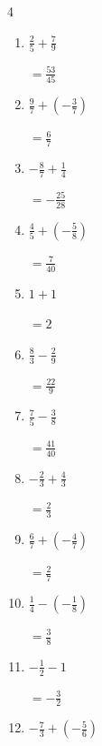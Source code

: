 \begin{multicols}{4}
\begin{enumerate}
        $\displaystyle =\frac{41}{18}$

  \item $\displaystyle \frac{2}{5} + \frac{7}{9}$

        $\displaystyle =\frac{53}{45}$

  \item $\displaystyle \frac{9}{7} + \left(-\frac{3}{7}\right)$

        $\displaystyle =\frac{6}{7}$

  \item $\displaystyle -\frac{8}{7} + \frac{1}{4}$

        $\displaystyle =-\frac{25}{28}$

  \item $\displaystyle \frac{4}{5} + \left(-\frac{5}{8}\right)$

        $\displaystyle =\frac{7}{40}$

  \item $\displaystyle 1 + 1$

        $\displaystyle =2$

  \item $\displaystyle \frac{8}{3} - \frac{2}{9}$

        $\displaystyle =\frac{22}{9}$

  \item $\displaystyle \frac{7}{5} - \frac{3}{8}$

        $\displaystyle =\frac{41}{40}$

  \item $\displaystyle -\frac{2}{3} + \frac{4}{3}$

        $\displaystyle =\frac{2}{3}$

  \item $\displaystyle \frac{6}{7} + \left(-\frac{4}{7}\right)$

        $\displaystyle =\frac{2}{7}$

\columnbreak %

  \item $\displaystyle \frac{1}{4} - \left(-\frac{1}{8}\right)$

        $\displaystyle =\frac{3}{8}$

  \item $\displaystyle -\frac{1}{2} - 1$

        $\displaystyle =-\frac{3}{2}$

  \item $\displaystyle -\frac{7}{3} + \left(-\frac{5}{6}\right)$


\end{enumerate}
\end{multicols}
